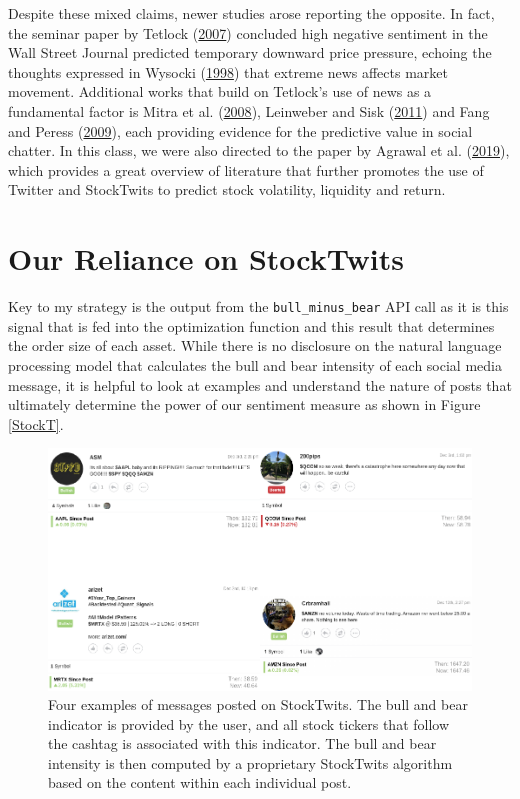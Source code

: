 \documentclass[11,]{article}
\begin{document}
Despite these mixed claims, newer studies arose reporting the opposite.
In fact, the seminar paper by Tetlock
(\protect\hyperlink{ref-tetlock2007}{2007}) concluded high negative
sentiment in the Wall Street Journal predicted temporary downward price
pressure, echoing the thoughts expressed in Wysocki
(\protect\hyperlink{ref-wysocki1998}{1998}) that extreme news affects
market movement. Additional works that build on Tetlock's use of news as
a fundamental factor is Mitra et al.
(\protect\hyperlink{ref-mitra2008}{2008}), Leinweber and Sisk
(\protect\hyperlink{ref-leinweber2011}{2011}) and Fang and Peress
(\protect\hyperlink{ref-fang2009}{2009}), each providing evidence for
the predictive value in social chatter. In this class, we were also
directed to the paper by Agrawal et al.
(\protect\hyperlink{ref-agrawal2019}{2019}), which provides a great
overview of literature that further promotes the use of Twitter and
StockTwits to predict stock volatility, liquidity and return.

\hypertarget{our-reliance-on-stocktwits}{%
\section{Our Reliance on StockTwits}\label{our-reliance-on-stocktwits}}

Key to my strategy is the output from the \texttt{bull\_minus\_bear} API
call as it is this signal that is fed into the optimization function and
this result that determines the order size of each asset. While there is
no disclosure on the natural language processing model that calculates
the bull and bear intensity of each social media message, it is helpful
to look at examples and understand the nature of posts that ultimately
determine the power of our sentiment measure as shown in Figure
\ref{StockT}.

\begin{figure}

{\centering \includegraphics[width=0.8\linewidth]{cahoon_final_paper_files/figure-latex/unnamed-chunk-2-1} 

}

\caption{\label{StockT}Four examples of messages posted on StockTwits. The bull and bear indicator is provided by the user, and all stock tickers that follow the cashtag is associated with this indicator. The bull and bear intensity is then computed by a proprietary StockTwits algorithm based on the content within each individual post.}\label{fig:unnamed-chunk-2}
\end{figure}
\end{document}
